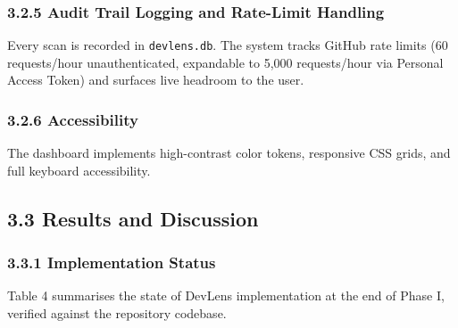 \documentclass[12pt,a4paper]{article}
\begin{document}
\subsubsection{3.2.5 Audit Trail Logging and Rate-Limit Handling}
Every scan is recorded in \texttt{devlens.db}. The system tracks GitHub rate limits (60 requests/hour unauthenticated, expandable to 5,000 requests/hour via Personal Access Token) and surfaces live headroom to the user.

\subsubsection{3.2.6 Accessibility}
The dashboard implements high-contrast color tokens, responsive CSS grids, and full keyboard accessibility.

\newpage
\thispagestyle{fancy}
\subsection{3.3 Results and Discussion}

\subsubsection{3.3.1 Implementation Status}
Table 4 summarises the state of DevLens implementation at the end of Phase I, verified against the repository codebase.
\end{document}
